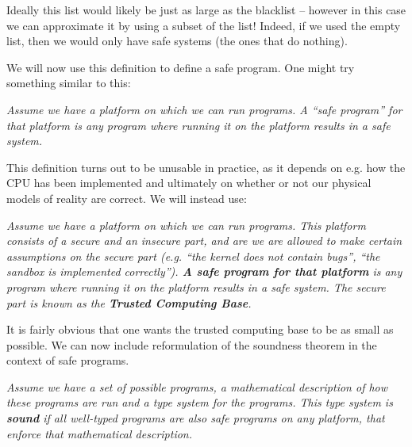 Ideally this list would likely be just as large as the blacklist -- however in
this case we can approximate it by using a subset of the list! Indeed, if we
used the empty list, then we would only have safe systems (the ones that do
nothing).

We will now use this definition to define a safe program. One might try
something similar to this:

\vspace{0.3cm}
\begin{addmargin}{1cm}
  {\it Assume we have a platform on which we can run programs. A ``safe
    program'' for that platform is any program where running it on the platform
    results in a safe system.}
\end{addmargin}
\vspace{0.3cm}

This definition turns out to be unusable in practice, as it depends on e.g. how
the CPU has been implemented and ultimately on whether or not our physical
models of reality are correct. We will instead use:

\vspace{0.3cm}
\begin{addmargin}{1cm}
  {\it Assume we have a platform on which we can run programs. This platform
    consists of a secure and an insecure part, and are we are allowed to make
    certain assumptions on the secure part (e.g. ``the kernel does not contain
    bugs'', ``the sandbox is implemented correctly''). \textbf{A safe program
      for that platform} is any program where running it on the platform results
    in a safe system. The secure part is known as the \textbf{Trusted Computing
      Base}.}
\end{addmargin}
\vspace{0.3cm}

It is fairly obvious that one wants the trusted computing base to be as small as
possible. We can now include reformulation of the soundness theorem in the
context of safe programs.

\vspace{0.3cm}
\begin{addmargin}{1cm}
  {\it Assume we have a set of possible programs, a mathematical description of
    how these programs are run and a type system for the programs. This type
    system is \textbf{sound} if all well-typed programs are also safe programs
    on any platform, that enforce that mathematical description.}
\end{addmargin}
\vspace{0.3cm}


